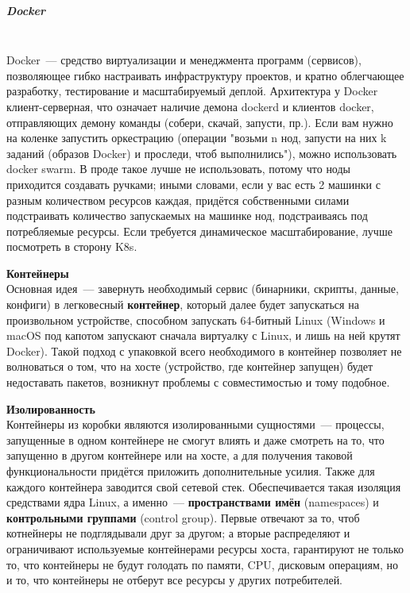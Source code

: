 \subparagraph{Docker} ~\\

    Docker~--- средство виртуализации и менеджмента программ (сервисов), позволяющее гибко настраивать инфраструктуру проектов, и кратно облегчающее разработку, тестирование и масштабируемый деплой. Архитектура у Docker клиент-серверная, что означает наличие демона dockerd и клиентов docker, отправляющих демону команды (собери, скачай, запусти, пр.). Если вам нужно на коленке запустить оркестрацию (операции "возьми n нод, запусти на них k заданий (образов Docker) и проследи, чтоб выполнились"), можно использовать docker swarm.\autocite{DockerSwarmConcepts} В проде такое лучше не использовать, потому что ноды приходится создавать ручками; иными словами, если у вас есть 2 машинки с разным количеством ресурсов каждая, придётся собственными силами подстраивать количество запускаемых на машинке нод, подстраиваясь под потребляемые ресурсы. Если требуется динамическое масштабирование, лучше посмотреть в сторону K8s.

    \textbf{Контейнеры} ~\\
    Основная идея~--- завернуть необходимый сервис (бинарники, скрипты, данные, конфиги) в легковесный \textbf{контейнер}, который далее будет запускаться на произвольном устройстве, способном запускать 64-битный Linux (Windows и macOS под капотом запускают сначала виртуалку с Linux, и лишь на ней крутят Docker). Такой подход с упаковкой всего необходимого в контейнер позволяет не волноваться о том, что на хосте (устройство, где контейнер запущен) будет недоставать пакетов, возникнут проблемы с совместимостью и тому подобное.

    \textbf{Изолированность} ~\\
    Контейнеры из коробки являются изолированными сущностями~--- процессы, запущенные в одном контейнере не смогут влиять и даже смотреть на то, что запущенно в другом контейнере или на хосте, а для получения таковой функциональности придётся приложить дополнительные усилия. Также для каждого контейнера заводится свой сетевой стек.
    Обеспечивается такая изоляция средствами ядра Linux, а именно~--- \textbf{пространствами имён} (namespaces) и \textbf{контрольными группами} (control group). Первые отвечают за то, чтоб котнейнеры не подглядывали друг за другом; а вторые распределяют и ограничивают используемые контейнерами ресурсы хоста, гарантируют не только то, что контейнеры не будут голодать по памяти, CPU, дисковым операциям, но и то, что контейнеры не отберут все ресурсы у других потребителей.

